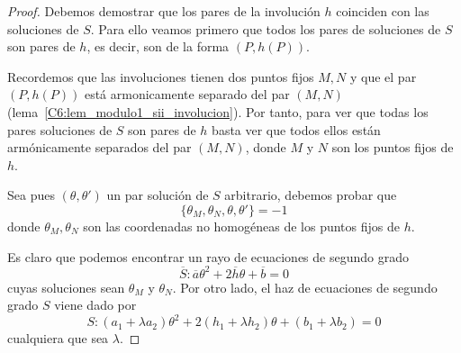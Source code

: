 \begin{proof}
	Debemos demostrar que  los pares de la involución $h$ coinciden con las soluciones de $S$. Para ello veamos primero que todos los pares de soluciones de $S$ son pares de $h$, es decir, son de la forma $(P,h(P))$. 
	
	Recordemos que las involuciones tienen dos puntos fijos $M,N$ y que el par $(P,h(P))$ está armonicamente separado del par $(M,N)$ (lema~\ref{C6:lem_modulo1_sii_involucion}). Por tanto, para ver que todas los pares soluciones de $S$ son pares de $h$ basta ver que todos ellos están armónicamente separados del par $(M,N)$, donde $M$ y $N$ son los puntos fijos de $h$.
	
	Sea pues $(\theta,\theta')$ un par solución de $S$ arbitrario, debemos probar que 
	\begin{equation*}
		\{\theta_M,\theta_N,\theta,\theta'\}=-1
	\end{equation*}
	donde $\theta_M,\theta_N$ son las coordenadas no homogéneas de los puntos fijos de $h$. 
	
	Es claro que podemos encontrar un rayo de ecuaciones de segundo grado
	\begin{equation*}
		\overline{S}:\overline{a}\theta^2+2\overline{h}\theta+\overline{b}=0
	\end{equation*}
	cuyas soluciones sean $\theta_M$ y $\theta_N$. Por otro lado, el haz de ecuaciones de segundo grado $S$ viene dado por
	\begin{equation*}
		S:(a_1+\lambda a_2)\theta^2+2(h_1+\lambda h_2)\theta+(b_1+\lambda b_2)=0
	\end{equation*}
	cualquiera que sea $\lambda$.
	

\end{proof}
